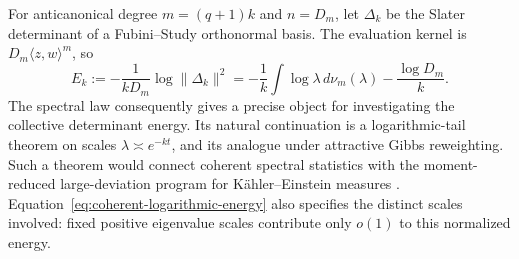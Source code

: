 For anticanonical degree $m=(q+1)k$ and $n=D_m$, let $\Delta_k$
be the Slater determinant of a Fubini--Study orthonormal basis.
The evaluation kernel is $D_m\langle z,w\rangle^m$, so
\begin{equation}
 E_k:=-\frac1{kD_m}\log\|\Delta_k\|^2
 =-\frac1k\int\log\lambda\,d\nu_m(\lambda)
    -\frac{\log D_m}{k}.
 \label{eq:coherent-logarithmic-energy}
\end{equation}
The spectral law consequently gives a precise object for investigating
the collective determinant energy.  Its natural continuation is a
logarithmic-tail theorem on scales $\lambda\asymp e^{-kt}$,
and its analogue under attractive Gibbs reweighting.  Such a theorem
would connect coherent spectral statistics with the moment-reduced
large-deviation program for K\"ahler--Einstein measures
\cite{AndreassonBermanSvensson2026}.  Equation~\eqref{eq:coherent-logarithmic-energy}
also specifies the distinct scales involved: fixed positive eigenvalue
scales contribute only $o(1)$ to this normalized energy.
